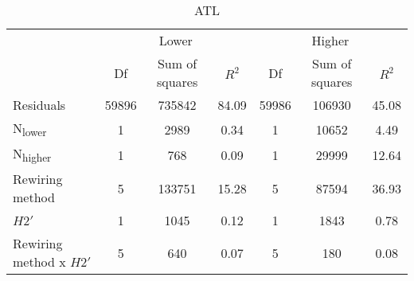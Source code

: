 \documentclass[12pt,a4paper]{article}
\begin{document}
\begin{table}
\medskip
    \begin{subtable}{\linewidth}
    \caption{ATL}
    \centering
\begin{tabularx}{\linewidth}{@{} X *6{c} @{}}
\toprule
  & \multicolumn{3}{c}{Lower} & \multicolumn{3}{c}{Higher} \\ \cmidrule(l){2-4} \cmidrule(l){5-7}
  						& Df		& Sum of squares	& $R^2$	& Df 	& Sum of squares	& $R^2$ \\ \midrule
Residuals 				& 59896 & 735842			& 84.09	& 59986 & 106930			& 45.08   \\
N\textsubscript{lower} 	& 1 		& 2989 		& 0.34 	& 1		& 10652 			& 4.49  \\
N\textsubscript{higher} 	& 1 		& 768 			& 0.09	& 1 		& 29999 			& 12.64  \\
Rewiring method 			& 5 		& 133751 			& 15.28 	& 5 		& 87594			& 36.93  \\
$H2'$ 					& 1 		& 1045 			& 0.12 	& 1 		& 1843			& 0.78 \\
Rewiring method x $H2'$ 	& 5 		& 640 			& 0.07 	& 5 		& 180			& 0.08  \\ \bottomrule
\end{tabularx}

\end{subtable}

\end{table}
\end{document}
